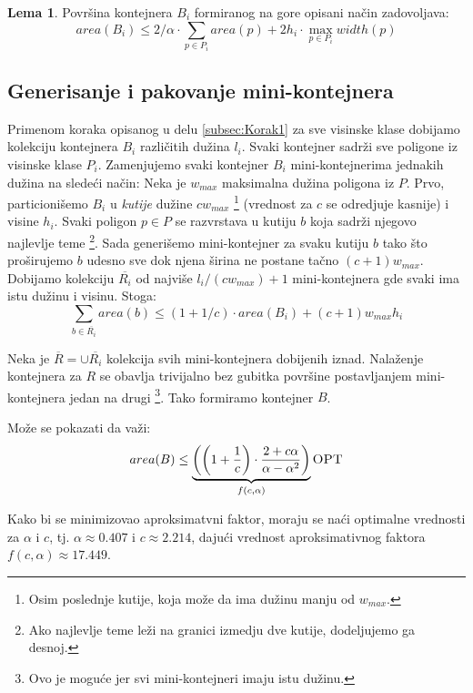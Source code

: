 \documentclass[a4paper]{article}
\theoremstyle{plain}
\theoremstyle{definition}
\newtheorem{lem}[thm]{Lema} %
\begin{document}
\begin{lem}
    Povr\v{s}ina kontejnera $B_{i}$ formiranog na gore opisani na\v{c}in zadovoljava: $$area(B_{i}) \leq 2/\alpha \cdot \sum_{p \in P_{i}}{area(p) + 2h_{i} \cdot \max_{p \in P_{i}}{width(p)}}$$
\end{lem}


\subsection{Generisanje i pakovanje mini-kontejnera}
\label{subsec:Korak2}

Primenom koraka opisanog u delu \ref{subsec:Korak1} za sve visinske klase dobijamo kolekciju kontejnera $B_{i}$ razli\v{c}itih du\v{z}ina $l_{i}$. Svaki kontejner sadr\v{z}i sve poligone iz visinske klase $P_{i}$. Zamenjujemo svaki kontejner $B_{i}$ mini-kontejnerima jednakih du\v{z}ina na slede\'c{}i na\v{c}in: Neka je $w_{max}$ maksimalna du\v{z}ina poligona iz $P$. Prvo, particioni\v{s}emo $B_{i}$ u \emph{kutije} du\v{z}ine $cw_{max}$ \footnote{Osim poslednje kutije, koja mo\v{z}e da ima du\v{z}inu manju od $w_{max}$.} (vrednost za $c$ se odredjuje kasnije) i visine $h_{i}$. Svaki poligon $p \in P$ se razvrstava u kutiju $b$ koja sadr\v{z}i njegovo najlevlje teme \footnote{Ako najlevlje teme le\v{z}i na granici izmedju dve kutije, dodeljujemo ga desnoj.}. Sada generi\v{s}emo mini-kontejner za svaku kutiju $b$ tako \v{s}to pro\v{s}irujemo $b$ udesno sve dok njena \v{s}irina ne postane ta\v{c}no $(c+1)w_{max}$. Dobijamo kolekciju $\overline{R_{i}}$ od najvi\v{s}e $l_{i}/(cw_{max}) + 1$ mini-kontejnera gde svaki ima istu du\v{z}inu i visinu. Stoga:
$$\sum_{b \in \overline{R_{i}}}{area(b)} \leq (1 + 1/c) \cdot area(B_{i}) + (c+1)w_{max}h_{i}$$

Neka je $\overline{R} = \cup{\overline{R_{i}}}$ kolekcija svih mini-kontejnera dobijenih iznad. Nala\v{z}enje kontejnera za $R$ se obavlja trivijalno bez gubitka povr\v{s}ine postavljanjem mini-kontejnera jedan na drugi \footnote{Ovo je mogu\'c{}e jer svi mini-kontejneri imaju istu du\v{z}inu.}. Tako formiramo kontejner $B$.

Mo\v{z}e se pokazati da va\v{z}i: $$area(B) \leq \underbrace{\left(\left(1+\frac{1}{c}\right) \cdot \frac{2 + c\alpha}{\alpha - \alpha^{2}}\right)}_{f(c,\alpha)} \textsc{OPT}$$ 

Kako bi se minimizovao aproksimatvni faktor, moraju se na\'c{}i optimalne vrednosti za $\alpha$ i $c$, tj. $\alpha \approx 0.407$ i $c \approx 2.214$, daju\'c{}i vrednost aproksimativnog faktora $f(c, \alpha) \approx 17.449$.
\end{document}
